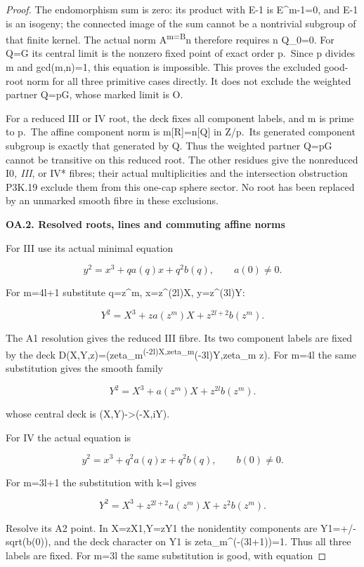 \begin{proof}
The endomorphism sum is zero: its product with E-1 is E\^{}m-1=0,
and E-1 is an isogeny; the connected image of the sum cannot be
a nontrivial subgroup of that finite kernel. The actual norm
A\textsuperscript{m=B}n therefore requires n Q\_0=0. For Q=G its central limit is
the nonzero fixed point of exact order p.~Since p divides m and
gcd(m,n)=1, this equation is impossible. This proves the excluded
good-root norm for all three primitive cases directly. It does
not exclude the weighted partner Q=pG, whose marked limit is O.

For a reduced III or IV root, the deck fixes all component labels,
and m is prime to p.~The affine component norm is
m{[}R{]}=n{[}Q{]} in Z/p.~Its generated component subgroup is exactly
that generated by Q. Thus the weighted partner Q=pG cannot be
transitive on this reduced root. The other residues give the
nonreduced I0\emph{, III}, or IV* fibres; their actual multiplicities
and the intersection obstruction P3K.19 exclude them from this
one-cap sphere sector. No root has been replaced by an unmarked
smooth fibre in these exclusions.

\par

\medskip\noindent\textbf{OA.2. Resolved roots, lines and commuting affine norms}

For III use its actual minimal equation

\[
y^2=x^3+q a(q)x+q^2b(q),\qquad a(0)\ne0.
\]

For m=4l+1 substitute q=z\^{}m, x=z\^{}(2l)X, y=z\^{}(3l)Y:

\[
Y^2=X^3+z a(z^m)X+z^{2l+2}b(z^m).
\]

The A1 resolution gives the reduced III fibre. Its two component
labels are fixed by the deck
D(X,Y,z)=(zeta\_m\textsuperscript{(-2l)X,zeta\_m}(-3l)Y,zeta\_m z).
For m=4l the same substitution gives the smooth family

\[
Y^2=X^3+a(z^m)X+z^{2l}b(z^m).
\]

whose central deck is (X,Y)-\textgreater(-X,iY).

For IV the actual equation is

\[
y^2=x^3+q^2a(q)x+q^2b(q),\qquad b(0)\ne0.
\]

For m=3l+1 the substitution with k=l gives

\[
Y^2=X^3+z^{2l+2}a(z^m)X+z^2b(z^m).
\]

Resolve its A2 point. In X=zX1,Y=zY1 the nonidentity components
are Y1=+/-sqrt(b(0)), and the deck character on Y1 is
zeta\_m\^{}(-(3l+1))=1. Thus all three labels are fixed. For m=3l
the same substitution is good, with equation


\end{proof}
